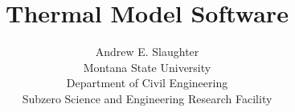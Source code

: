\documentclass[10pt,twoside,titlepage]{article}		%
\title{Thermal Model Software}
\author{Andrew E. Slaughter\\Montana State University\\Department of Civil Engineering\\Subzero Science and Engineering Research Facility}
\begin{document}
\maketitle\clearpage
{}
\tableofcontents\clearpage
\listoftables
\listoffigures\clearpage


\clearpage
\renewcommand{\bibsection}{\section{References}}
 

\end{document}
